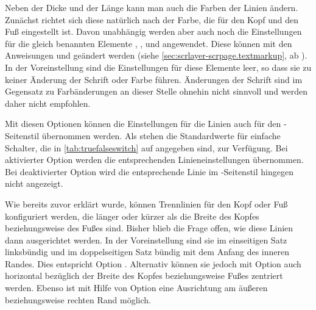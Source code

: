 \BeginIndexGroup
{}%
%
%
%
Neben der Dicke und der Länge kann man auch die Farben der Linien
ändern. Zunächst richtet sich diese natürlich nach der Farbe, die für den Kopf
und den Fuß eingestellt ist. Davon unabhängig werden aber auch noch die
Einstellungen für die gleich benannten
Elemente ,
,  und
 angewendet. Diese können mit den Anweisungen
 und
 geändert werden (siehe
\autoref{sec:scrlayer-scrpage.textmarkup}, ab
). In der Voreinstellung sind die
Einstellungen für diese Elemente leer, so dass sie zu keiner Änderung der
Schrift oder Farbe führen. Änderungen der Schrift sind im Gegensatz zu
Farbänderungen an dieser Stelle ohnehin nicht sinnvoll und werden daher nicht
empfohlen.%
\EndIndexGroup
%
\EndIndexGroup


\begin{Declaration}
\end{Declaration}
Mit diesen Optionen können die Einstellungen für die Linien auch für den
-Seitenstil übernommen werden. Als 
stehen die Standardwerte für einfache Schalter, die in
\autoref{tab:truefalseswitch} auf  angegeben
sind, zur Verfügung. Bei aktivierter Option werden die entsprechenden
Linieneinstellungen übernommen. Bei deaktivierter Option wird die
entsprechende Linie im -Seitenstil hingegen nicht angezeigt.
%
\EndIndexGroup


\begin{Declaration}
\end{Declaration}
Wie bereits zuvor erklärt wurde, können Trennlinien für den Kopf oder Fuß
konfiguriert werden, die länger oder kürzer als die Breite des Kopfes
beziehungsweise des Fußes sind. Bisher blieb die Frage offen, wie diese Linien
dann ausgerichtet werden. In der Voreinstellung sind sie im einseitigen Satz
linksbündig und im doppelseitigen Satz bündig mit dem Anfang des inneren
Randes. Dies entspricht Option . Alternativ können sie jedoch
mit Option  auch horizontal bezüglich der Breite des Kopfes
beziehungsweise Fußes zentriert werden. Ebenso ist mit Hilfe von Option
 eine Ausrichtung am äußeren beziehungsweise rechten Rand
möglich.%
\EndIndexGroup
%
\EndIndexGroup


